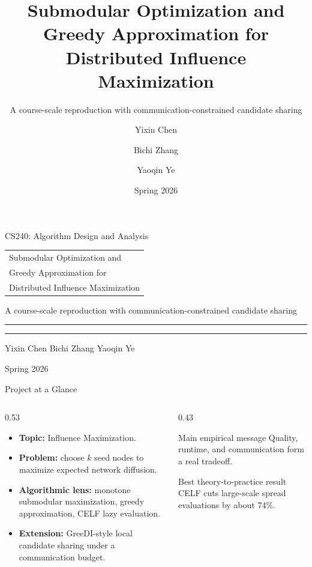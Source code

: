 \documentclass[10pt, aspectratio=169]{beamer}
\title[Distributed Influence Maximization]{Submodular Optimization and Greedy Approximation for Distributed Influence Maximization}
\subtitle{A course-scale reproduction with communication-constrained candidate sharing}
\author{Yixin Chen \and Bichi Zhang \and Yaoqin Ye}
\institute{CS240: Algorithm Design and Analysis}
\date{Spring 2026}
\newcommand{\metricbox}[2]{%
    \begin{block}{#1}
        \centering\Large #2
    \end{block}
}
\begin{document}
\begingroup
{}
\begin{frame}[plain]
    \vspace{0.72cm}
    {\color{deepteal}\large CS240: Algorithm Design and Analysis}

    \vspace{0.44cm}
    \begingroup
    \color{ink}\sffamily\bfseries\fontsize{22}{28}\selectfont
    \begin{tabular}{@{}l@{}}
    Submodular Optimization and\\
    Greedy Approximation for\\
    Distributed Influence Maximization
    \end{tabular}
    \endgroup

    \vspace{0.34cm}
    {\color{deepteal}\rmfamily\large
    A course-scale reproduction with communication-constrained candidate sharing\par}

    \vspace{0.52cm}
    {\color{amber}\rule{0.18\linewidth}{1.4pt}\hspace{0.16cm}
    \color{deepteal}\rule{0.54\linewidth}{1.4pt}}

    \vfill
    {\color{ink}\rmfamily\large Yixin Chen \quad Bichi Zhang \quad Yaoqin Ye}

    \vspace{0.16cm}
    {\color{deepteal}\rmfamily Spring 2026}
\end{frame}
\endgroup

\begin{frame}{Project at a Glance}
    \begin{columns}[T,onlytextwidth]
        \begin{column}{0.53\linewidth}
            \begin{itemize}
                \item \textbf{Topic:} Influence Maximization.
                \item \textbf{Problem:} choose $k$ seed nodes to maximize expected network diffusion.
                \item \textbf{Algorithmic lens:} monotone submodular maximization, greedy approximation, CELF lazy evaluation.
                \item \textbf{Extension:} GreeDI-style local candidate sharing under a communication budget.
            \end{itemize}
        \end{column}
        \begin{column}{0.43\linewidth}
            \metricbox{Main empirical message}{Quality, runtime, and communication form a real tradeoff.}
            \metricbox{Best theory-to-practice result}{CELF cuts large-scale spread evaluations by about 74\%.}
        \end{column}
    \end{columns}
\end{frame}
\end{document}
